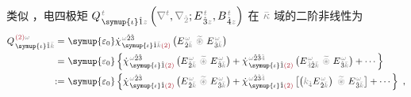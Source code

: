 类似 ，电四极矩 $Q^{\;\!\mathcolor{gray}{t}}_{\;\! \symup{\iota} \hat{1} \mathcolor{gray}{z}} \left( \mathcolor{gray}{\nabla^t}, \mathcolor{gray}{\nabla_{\hat{2}}} ; E^{\;\!\mathcolor{gray}{t}}_{\;\! \hat{3}\mathcolor{gray}{z}}, B^{\;\!\mathcolor{gray}{t}}_{\;\! \hat{4}\mathcolor{gray}{z}} \right)$ 在 $\mathcolor{gray}{\bar{\kappa}}$ 域的二阶非线性为
\begin{subequations}
\begin{align}
	Q^{\;\! \textcolor{Maroon}{(2)} \mathcolor{gray}{\omega}}_{\;\! \symup{\iota} \hat{1} \mathcolor{gray}{\bar{k}}} =&~ {\symup{\varepsilon_0}} \dot{\chi}^{\;\! \mathcolor{gray}{\omega} \hat{2} \hat{3}}_{\;\! \symup{\iota} \hat{1} \mathcolor{gray}{\bar{k}} \textcolor{Maroon}{(2)}} \left( E^{\;\!\mathcolor{gray}{\omega}}_{\;\! \hat{2} \mathcolor{gray}{\bar{k}}} ~\mathcolor{gray}{\widetilde \circledast}~ E^{\;\!\mathcolor{gray}{\omega}}_{\;\! \hat{3} \mathcolor{gray}{\bar{k}}} \right) \\ =&~ {\symup{\varepsilon_0}} \left\{ \dot{\chi}^{\;\! \mathcolor{gray}{\omega} \hat{2} \hat{3}}_{\;\! \symup{\iota} \hat{1} \textcolor{Maroon}{(2)}} \left( E^{\;\!\mathcolor{gray}{\omega}}_{\;\! \hat{2} \mathcolor{gray}{\bar{k}}} ~\mathcolor{gray}{\widetilde \circledast}~ E^{\;\!\mathcolor{gray}{\omega}}_{\;\! \hat{3} \mathcolor{gray}{\bar{k}}} \right) + \dot{\chi}^{\;\! \mathcolor{gray}{\omega} \hat{2} \hat{3} \mathcolor{gray}{\hat{4}}}_{\;\! \symup{\iota} \hat{1} \textcolor{Maroon}{(2)}} \left( E^{\;\!\mathcolor{gray}{\omega}}_{\;\! \mathcolor{gray}{\hat{4}} \hat{2} \mathcolor{gray}{\bar{k}}} ~\mathcolor{gray}{\widetilde \circledast}~ E^{\;\!\mathcolor{gray}{\omega}}_{\;\! \hat{3} \mathcolor{gray}{\bar{k}}} \right) + \cdots \right\} \label{eq:Q(2)_wk}
	\\ :=&~ {\symup{\varepsilon_0}} \left\{ \dot{\chi}^{\;\! \mathcolor{gray}{\omega} \hat{2} \hat{3}}_{\;\! \symup{\iota} \hat{1} \textcolor{Maroon}{(2)}} \left( E^{\;\!\mathcolor{gray}{\omega}}_{\;\! \hat{2} \mathcolor{gray}{\bar{k}}} ~\mathcolor{gray}{\widetilde \circledast}~ E^{\;\!\mathcolor{gray}{\omega}}_{\;\! \hat{3} \mathcolor{gray}{\bar{k}}} \right) + \dot{\chi}^{\;\! \mathcolor{gray}{\omega} \hat{2} \hat{3} \mathcolor{gray}{\hat{4}}}_{\;\! \symup{\iota} \hat{1} \textcolor{Maroon}{(2)}} \left[ \left( \mathcolor{gray}{k_{\hat{4}}} E^{\;\!\mathcolor{gray}{\omega}}_{\;\! \hat{2} \mathcolor{gray}{\bar{k}}} \right) ~\mathcolor{gray}{\widetilde \circledast}~ E^{\;\!\mathcolor{gray}{\omega}}_{\;\! \hat{3} \mathcolor{gray}{\bar{k}}} \right] + \cdots \right\}~,
\end{align}
\end{subequations}
